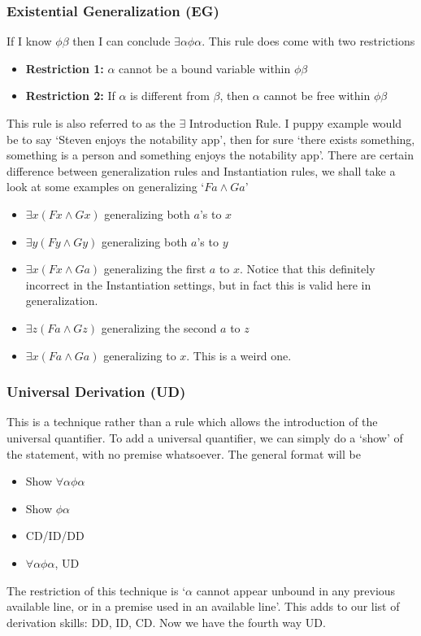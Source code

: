 \documentclass[10pt]{article}
\begin{document}
\subsubsection{Existential Generalization (EG)}
If I know $\phi \beta$ then I can conclude $\exists \alpha \phi \alpha$. This rule does come with two restrictions
\begin{itemize}
    \item \textbf{Restriction 1:} $\alpha$ cannot be a bound variable within $\phi \beta$
    \item \textbf{Restriction 2:} If $\alpha $ is different from $\beta$, then $\alpha$ cannot be free within $\phi \beta$
\end{itemize}
This rule is also referred to as the $\exists$ Introduction Rule. I puppy example would be to say `Steven enjoys the notability app', then for sure `there exists something, something is a person and something enjoys the notability app'. There are certain difference between generalization rules and Instantiation rules, we shall take a look at some examples on generalizing `$Fa\wedge Ga$'
\begin{itemize}
    \item $\exists x(Fx \wedge Gx)$ generalizing both $a$'s to $x$
    \item $\exists y(Fy \wedge Gy)$ generalizing both $a$'s to $y$
    \item $\exists x(Fx \wedge Ga)$ generalizing the first $a$ to $x$. Notice that this definitely incorrect in the Instantiation settings, but in fact this is valid here in generalization. 
    \item $\exists z(Fa \wedge Gz)$ generalizing the second $a$ to $z$
    \item $\exists x (Fa \wedge Ga)$ generalizing to $x$. This is a weird one.
\end{itemize}

\subsubsection{Universal Derivation (UD)} This is a technique rather than a rule which allows the introduction of the universal quantifier. To add a universal quantifier, we can simply do a `show' of the statement, with no premise whatsoever. The general format will be
\begin{itemize}
    \item Show $\forall \alpha \phi \alpha$
    \item \quad Show $\phi \alpha$
    \item \quad CD/ID/DD 
    \item $\forall \alpha\phi \alpha$, UD
\end{itemize}
The restriction of this technique is `$\alpha$ cannot appear unbound in any previous available line, or in a premise used in an available line'. This adds to our list of derivation skills: DD, ID, CD. Now we have the fourth way UD. 
\end{document}
